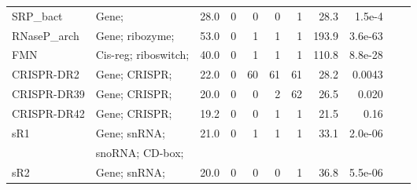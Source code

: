 \begin{footnotesize}
\begin{table}
\begin{center}
\begin{tabular}{|l|l|r|r||r|r|r||r|r||r|r||}
SRP\_bact                       &  Gene;                 &  28.0  &     0  &       0  &       0  &      1 &   28.3  &  1.5e-4  \\
RNaseP\_arch                    &  Gene; ribozyme;       &  53.0  &     0  &       1  &       1  &      1 &  193.9  & 3.6e-63  \\
FMN                             &  Cis-reg; riboswitch;  &  40.0  &     0  &       1  &       1  &      1 &  110.8  & 8.8e-28  \\
CRISPR-DR2                      &  Gene; CRISPR;         &  22.0  &     0  &      60  &      61  &     61 &   28.2  &  0.0043  \\
CRISPR-DR39                     &  Gene; CRISPR;         &  20.0  &     0  &       0  &       2  &     62 &   26.5  &   0.020  \\
CRISPR-DR42                     &  Gene; CRISPR;         &  19.2  &     0  &       0  &       1  &      1 &   21.5  &    0.16  \\
sR1                             &  Gene; snRNA;          &  21.0  &     0  &       1  &       1  &      1 &   33.1  & 2.0e-06  \\
                                &  snoRNA; CD-box;       &        &        &          &          &        &         &          \\
sR2                             &  Gene; snRNA;          &  20.0  &     0  &       0  &       0  &      1 &   36.8  & 5.5e-06  \\

\end{tabular}
\end{center}
\end{table}
\end{footnotesize}
